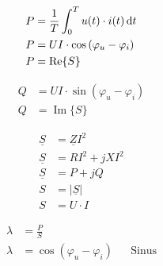 \begin{boxleft}
\end{boxleft}\begin{boxrightshaded}
\begin{align*}
P&=\frac{1}{T}\int_0^T u(t)\cdot i(t)\mathop{}\!\mathrm{d} t \\
P&=UI\cdot \cos{\left(\varphi_u-\varphi_i\right)}\\
P&=\operatorname{Re}\{S\}
\end{align*}
\end{boxrightshaded}

\begin{boxleft}
\end{boxleft}\begin{boxrightshaded}
\begin{align*}
Q&=UI\cdot\sin{\left(\varphi_u-\varphi_i\right)}\\
Q&=\operatorname{Im}\{S\}
\end{align*}
\end{boxrightshaded}

\begin{boxleft}
\end{boxleft}\begin{boxrightshaded}
\begin{align*}
\underline{S}&=\underline{Z}I^2\\
\underline{S}&=RI^2+jXI^2\\
\underline{S}&=P+jQ\\
S&=\left|\underline{S}\right|\\
S&=U\cdot I
\end{align*}
\end{boxrightshaded}

\begin{boxleft}
\end{boxleft}\begin{boxrightshaded}
\begin{align*}
\lambda&=\frac{P}{S}\\
\lambda&=\cos{\left(\varphi_u-\varphi_i\right)} && \text{Sinus}
\end{align*}
\end{boxrightshaded}
\newpage

\newpage

